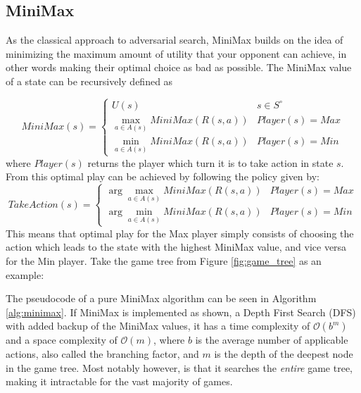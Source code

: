 \subsection{MiniMax}

As the classical approach to adversarial search, MiniMax builds on the idea of minimizing the maximum amount of utility that your opponent can achieve, in other words making their optimal choice as bad as possible. The MiniMax value of a state can be recursively defined as

\begin{equation}
    MiniMax(s) = \begin{cases}
        U(s) & s \in S^\circ \\
        \max_{a \in A(s)} MiniMax(R(s, a)) & Player(s) = Max \\
        \min_{a \in A(s)} MiniMax(R(s, a)) & Player(s) = Min
    \end{cases}
    \label{eq:MiniMax}
\end{equation}
where $Player(s)$ returns the player which turn it is to take action in state $s$. From this optimal play can be achieved by following the policy given by:
\begin{equation}
    TakeAction(s) = \begin{cases}
        \arg\max_{a \in A(s)} MiniMax(R(s, a)) & Player(s) = Max \\
        \arg\min_{a \in A(s)} MiniMax(R(s, a)) & Player(s) = Min
    \end{cases}
    \label{eq:MiniMax_policy}
\end{equation}
This means that optimal play for the Max player simply consists of choosing the action which leads to the state with the highest MiniMax value, and vice versa for the Min player. Take the game tree from Figure \ref{fig:game_tree} as an example:





The pseudocode of a pure MiniMax algorithm can be seen in Algorithm \ref{alg:minimax}. If MiniMax is implemented as shown, a Depth First Search (DFS) with added backup of the MiniMax values, it has a time complexity of $\mathcal{O}(b^m)$ and a space complexity of $\mathcal{O}(m)$, where $b$ is the average number of applicable actions, also called the branching factor, and $m$ is the depth of the deepest node in the game tree. Most notably however, is that it searches the \textit{entire} game tree, making it intractable for the vast majority of games.

